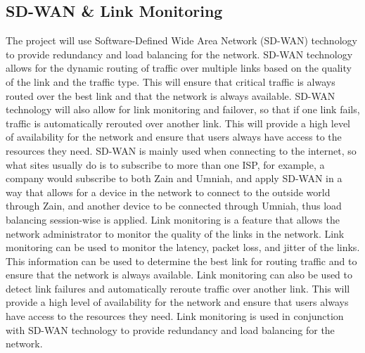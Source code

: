 \documentclass[12pt]{report}
\begin{document}
\subsection{SD-WAN \& Link Monitoring}
The project will use Software-Defined Wide Area Network (SD-WAN) technology to provide redundancy and load balancing for the network. SD-WAN technology allows for the dynamic routing of traffic over multiple links based on the quality of the link and the traffic type. This will ensure that critical traffic is always routed over the best link and that the network is always available. SD-WAN technology will also allow for link monitoring and failover, so that if one link fails, traffic is automatically rerouted over another link. This will provide a high level of availability for the network and ensure that users always have access to the resources they need. SD-WAN is mainly used when connecting to the internet, so what sites usually do is to subscribe to more than one ISP, for example, a company would subscribe to both Zain and Umniah, and apply SD-WAN in a way that allows for a device in the network to connect to the outside world through Zain, and another device to be connected through Umniah, thus load balancing session-wise is applied. \cite{SDWAN}
Link monitoring is a feature that allows the network administrator to monitor the quality of the links in the network. Link monitoring can be used to monitor the latency, packet loss, and jitter of the links. This information can be used to determine the best link for routing traffic and to ensure that the network is always available. Link monitoring can also be used to detect link failures and automatically reroute traffic over another link. This will provide a high level of availability for the network and ensure that users always have access to the resources they need. Link monitoring is used in conjunction with SD-WAN technology to provide redundancy and load balancing for the network. \cite{LinkMonitor}
\end{document}
